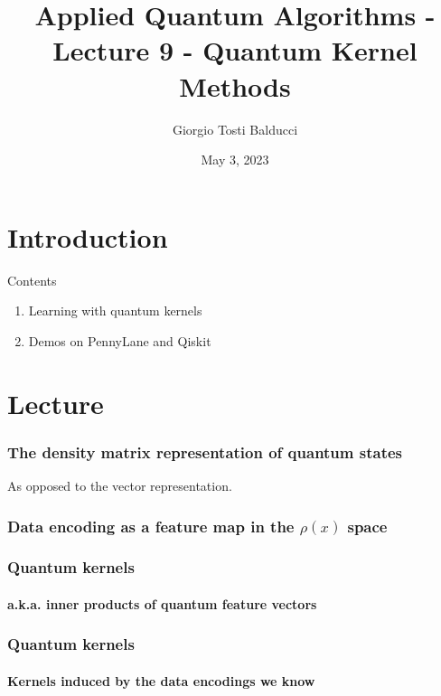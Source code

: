 \documentclass[aspectratio=43]{beamer}
\title[]{Applied Quantum Algorithms - Lecture 9 - Quantum Kernel Methods}
\institute[]{Delft University of Technology, The Netherlands}
\author{Giorgio Tosti Balducci}
\date{May 3, 2023}
\renewcommand{\cite}[1]{\footnote<.->[frame]{\fullcite{#1}}}
\begin{document}
\section{Introduction}
{
\frame{\titlepage}
}

\begin{frame}{Contents} %
\begin{enumerate}
  \item Learning with quantum kernels
  \item Demos on PennyLane and Qiskit
\end{enumerate}
\end{frame}

\section{Lecture}

\begin{frame}
  \frametitle{The density matrix representation of quantum states}
    As opposed to the vector representation.
\end{frame}


\begin{frame}
  \frametitle{Data encoding as a feature map in the $\rho(x)$ space}

  

\end{frame}


\begin{frame}
  \frametitle{Quantum kernels}
  \framesubtitle{a.k.a. inner products of quantum feature vectors}

  

\end{frame}


\begin{frame}
  \frametitle{Quantum kernels}
  \framesubtitle{Kernels induced by the data encodings we know}



\end{frame}
\end{document}
